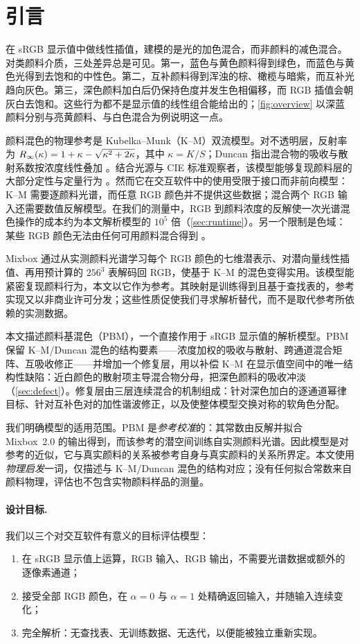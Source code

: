 \section{引言}
\label{sec:intro}

在 sRGB 显示值中做线性插值，建模的是光的加色混合，而非颜料的减色混合。对类颜料介质，三处差异总是可见。第一，蓝色与黄色颜料得到绿色，而蓝色与黄色光得到去饱和的中性色。第二，互补颜料得到浑浊的棕、橄榄与暗紫，而互补光趋向灰色。第三，深色颜料加白后仍保持色度并发生色相偏移，而 RGB 插值会朝灰白去饱和。这些行为都不是显示值的线性组合能给出的；\cref{fig:overview} 以深蓝颜料分别与亮黄颜料、与白色混合为例说明这一点。

颜料混色的物理参考是 Kubelka--Munk（K--M）双流模型。对不透明层，反射率为 $R_{\infty}(\kappa)=1+\kappa-\sqrt{\kappa^{2}+2\kappa}$，其中 $\kappa=K/S$；Duncan 指出混合物的吸收与散射系数按浓度线性叠加 \cite{kubelka1931,duncan1940}。结合光源与 CIE 标准观察者，该模型能够复现颜料层的大部分定性与定量行为 \cite{haase1992,wyszecki2000}。然而它在交互软件中的使用受限于接口而非前向模型：K--M 需要逐颜料光谱，而任意 RGB 颜色并不提供这些数据；混合两个 RGB 输入还需要数值反解模型。在我们的测量中，RGB 到颜料浓度的反解使一次光谱混色操作的成本约为本文解析模型的 $10^{5}$ 倍（\cref{sec:runtime}）。另一个限制是色域：某些 RGB 颜色无法由任何可用颜料混合得到 \cite{pointer1980}。

Mixbox \cite{sochorova2021} 通过从实测颜料光谱学习每个 RGB 颜色的七维潜表示、对潜向量线性插值、再用预计算的 $256^{3}$ 表解码回 RGB，使基于 K--M 的混色变得实用。该模型能紧密复现颜料行为，本文以它作为参考。其映射是训练得到且基于查找表的，参考实现又以非商业许可分发；这些性质促使我们寻求解析替代，而不是取代参考所依赖的实测数据。

本文描述颜料基混色（PBM），一个直接作用于 sRGB 显示值的解析模型。PBM 保留 K--M/Duncan 混色的结构要素——浓度加权的吸收与散射、跨通道混合矩阵、互吸收修正——并增加一个修复层，用以补偿 K--M 在显示值空间中的唯一结构性缺陷：近白颜色的散射项主导混合物分母，把深色颜料的吸收冲淡（\cref{sec:defect}）。修复层由三层连续混合的机制组成：针对深色加白的逐通道幂律目标、针对互补色对的加性谐波修正，以及使整体模型交换对称的软角色分配。

我们明确模型的适用范围。PBM 是\emph{参考校准}的：其常数由反解并拟合 Mixbox~2.0 的输出得到，而该参考的潜空间训练自实测颜料光谱。因此模型是对参考的近似，它与真实颜料的关系被参考自身与真实颜料的关系所界定。本文使用\emph{物理启发}一词，仅描述与 K--M/Duncan 混色的结构对应；没有任何拟合常数来自颜料物理，评估也不包含实物颜料样品的测量。

\paragraph{设计目标.}
我们以三个对交互软件有意义的目标评估模型：
\begin{enumerate}[label=R\arabic*.,leftmargin=2.2em]
\item 在 sRGB 显示值上运算，RGB 输入、RGB 输出，不需要光谱数据或额外的逐像素通道；
\item 接受全部 RGB 颜色，在 $\alpha=0$ 与 $\alpha=1$ 处精确返回输入，并随输入连续变化；
\item 完全解析：无查找表、无训练数据、无迭代，以便能被独立重新实现。
\end{enumerate}

